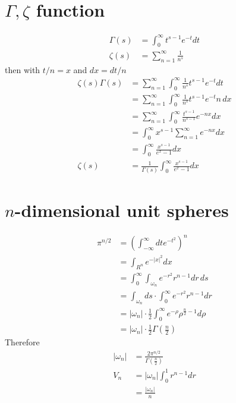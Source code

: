 \documentclass[10pt,a4paper]{book}
\theoremstyle{definition}
\begin{document}
\section{\texorpdfstring{$\Gamma,\zeta $}{TEXT} function}
\begin{align}
    \Gamma(s)&=\int_0^\infty t^{s-1}e^{-t} dt\\
    \zeta(s)&=\sum_{n=1}^\infty\frac{1}{n^s}
\end{align}
then with $t/n=x$ and $dx=dt/n$
\begin{align}
	\zeta(s)\Gamma(s)
	&=\sum_{n=1}^\infty\int_0^\infty \frac{1}{n^s}t^{s-1}e^{-t} dt\\
	&=\sum_{n=1}^\infty\int_0^\infty \frac{1}{n^s}t^{s-1}e^{-t} n\,dx\\
	&=\sum_{n=1}^\infty\int_0^\infty \frac{t^{s-1}}{n^{s-1}}e^{-nx} dx\\
	&=\int_0^\infty x^{s-1}\sum_{n=1}^\infty e^{-nx} dx\\
	&=\int_0^\infty \frac{x^{s-1}}{e^{x}-1} dx\\
\zeta(s)&=\frac{1}{\Gamma(s)}\int_0^\infty \frac{x^{s-1}}{e^{x}-1} dx
\end{align}



\section{\texorpdfstring{$n$}{TEXT}-dimensional unit spheres}
\begin{align}
    \pi^{n/2}
    &=\left(\int_{-\infty}^\infty dt e^{-t^2}\right)^n\\
    &=\int_{R^n} e^{-|x|^2}dx\\
    &=\int_0^\infty\int_{\omega_n}e^{-r^2}r^{n-1}dr\,ds\\
    &=\int_{\omega_n}ds\cdot\int_0^\infty e^{-r^2}r^{n-1}dr\\
    &=|\omega_n|\cdot\frac{1}{2}\int_0^\infty e^{-\rho}\rho^{\frac{n}{2}-1}d\rho\\
    &=|\omega_n|\cdot\frac{1}{2}\Gamma\left(\frac{n}{2}\right)
\end{align}
Therefore
\begin{align}
|\omega_n| &= \frac{2\pi^{n/2}}{\Gamma\left(\frac{n}{2}\right)}\\
V_n 
&=|\omega_n|\int_0^1r^{n-1}dr\\
&=\frac{|\omega_n|}{n}
\end{align}
\end{document}
